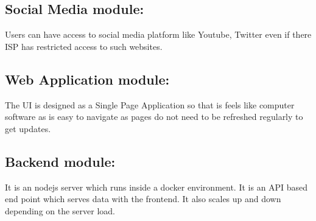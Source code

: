 \subsection{Social Media module:}

 Users can have access to social media platform like Youtube, Twitter even if there ISP has restricted access to such websites.


\subsection{Web Application module:}

The UI is designed as a Single Page Application so that is feels like computer software as is easy to navigate as pages do not need to be refreshed regularly to get updates.






\subsection{Backend module:}

It is an nodejs server which runs inside a docker environment. It is an API based end point which serves data with the frontend. It also scales up and down depending on the server load. 

\newpage
